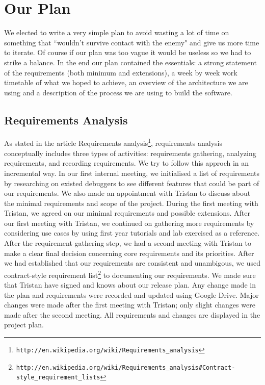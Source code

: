 \documentclass[11pt]{article}
\begin{document}
\section{Our Plan}

We elected to write a very simple plan to avoid wasting a lot of time on something that ``wouldn't survive contact with the enemy" and give us more time to iterate. 
Of course if our plan was too vague it would be useless so we had to strike a balance.
In the end our plan contained the essentials: a strong statement of the requirements (both minimum and extensions), a week by week work timetable of what we hoped to achieve, an overview of the architecture we are using and a description of the process we are using to build the software.

\subsection{Requirements Analysis}
As stated in the article Requirements analysis\footnote{\tt{http://en.wikipedia.org/wiki/Requirements\_analysis}}, requirements analysis conceptually includes three types of activities: requirements gathering, analyzing requirements, and recording requirements. We try to follow this approch in an incremental way. In our first internal meeting, we initialised a list of requirements by researching on existed debuggers to see different features that could be part of our requirements. We also made an appointment with Tristan to discuss about the minimal requirements and scope of the project. During the first meeting with Tristan, we agreed on our minimal requirements and possible extensions. After our first meeting with Tristan, we continued on gathering more requirements by considering use cases by using first year tutorials and lab exercised as a reference.
After the requirement gathering step, we had a second meeting with Tristan to make a clear final decision concerning core requirements and its priorities. After we had established that our requirements are consistent and unambigous, we used contract-style requirement list\footnote{\tt{http://en.wikipedia.org/wiki/Requirements\_analysis\#Contract-style\_requirement\_lists}} to documenting our requirements. We made sure that Tristan have signed and knows about our release plan.
Any change made in the plan and requirements were recorded and updated using Google Drive. Major changes were made after the first meeting with Tristan; only slight changes were made after the second meeting.
All requirements and changes are displayed in the project plan.
\end{document}
